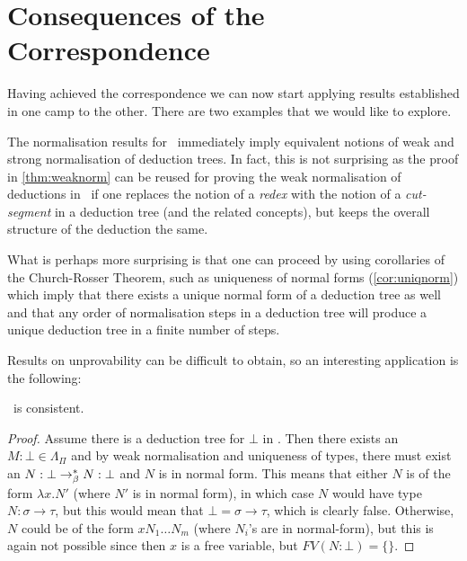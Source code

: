 \section{Consequences of the Correspondence}

Having achieved the correspondence we can now start applying results
established in one camp to the other. There are two examples that we would like
to explore.

The normalisation results for \stlambda\ immediately imply equivalent notions
of weak and strong normalisation of deduction trees. In fact, this is not
surprising as the proof in \ref{thm:weaknorm} can be reused for proving the
weak normalisation of deductions in \implnpi\ if one replaces the notion of a
\emph{redex} with the notion of a \emph{cut-segment} in a deduction tree (and the
related concepts), but keeps the overall structure of the deduction the same.

What is perhaps more surprising is that one can proceed by using corollaries of
the Church-Rosser Theorem, such as uniqueness of normal forms
(\ref{cor:uniqnorm}) which imply that there exists a unique normal form of a
deduction tree as well and that any order of normalisation steps in a
deduction tree will produce a unique deduction tree in a finite number of steps.

Results on unprovability can be difficult to obtain, so an interesting
application is the following:

\begin{proposition}\implnpi\ is consistent.\end{proposition}
\begin{proof}
    Assume there is a deduction tree for $\bot$ in \implnpi. Then there exists
    an $M\!:\!\bot \in \Lambda_\Pi$ and by weak normalisation and uniqueness of
    types, there must exist an $N:\bot \rightarrow_\beta^* N:\bot$ and $N$ is in normal
    form. This means that either $N$ is of the form $\lambda x. N'$ (where $N'$
    is in normal form), in which case $N$ would have type $N:\sigma\to\tau$,
    but this would mean that $\bot = \sigma\to\tau$, which is clearly false.
    Otherwise, $N$ could be of the form $x N_1 \ldots N_m$ (where $N_i$'s are
    in normal-form), but this is again not possible since then $x$ is a free
    variable, but $FV(N:\bot) = \{\}$.
\end{proof}

